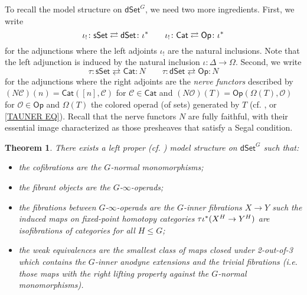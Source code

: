 \documentclass[a4paper,10pt]{article}%
\numberwithin{equation}{section}
\numberwithin{figure}{section}
\newtheorem{theorem}[equation]{Theorem}%
\theoremstyle{definition} %
\newcommand{\dSet}{\mathsf{dSet}}
\newcommand{\1}{\ensuremath{\mathbbm 1}}%
\begin{document}
To recall the model structure on $\mathsf{dSet}^G$,
we need two more ingredients.
First, we write
\begin{equation}\label{IOTASHADJ EQ}
	\iota_! \colon 
	\mathsf{sSet}
	\rightleftarrows
	\mathsf{dSet}
	\colon
	\iota^{\**}
\qquad
	\iota_! \colon 
	\mathsf{Cat}
	\rightleftarrows
	\mathsf{Op}
	\colon
	\iota^{\**}
\end{equation}
for the adjunctions
where the left adjoints $\iota_!$
are the natural inclusions.
Note that the left adjunction is induced by the natural inclusion
$\iota \colon \Delta \to \Omega$.
Second, we write
\begin{equation}\label{TAUADJ EQ}
	\tau \colon 
	\mathsf{sSet}
	\rightleftarrows
	\mathsf{Cat}
	\colon
	N
\qquad
	\tau \colon 
	\mathsf{dSet}
	\rightleftarrows
	\mathsf{Op}
	\colon
	N
\end{equation}
for the adjunctions where the right adjoints are the 
\emph{nerve functors}
described by
$(N \mathcal{C})(n) = 
\mathsf{Cat}\left([n],\mathcal{C}\right)$
for $\mathcal{C}\in \mathsf{Cat}$
and
$(N \mathcal{O})(T) = 
\mathsf{Op}\left(\Omega(T),\mathcal{O}\right)$
for $\mathcal{O}\in \mathsf{Op}$
and $\Omega(T)$ the colored operad (of sets) generated by $T$
(cf. \cite[\S 3]{MW07}, \cite[Rem. 4.4, Ex. 4.6]{Per18} or \eqref{TAUNER EQ}).
Recall \cite[Prop. 5.3 and Thm. 6.1]{MW09}
that the nerve functors $N$ are fully faithful, 
with their essential image characterized
as those presheaves 
that satisfy a Segal condition.



\begin{theorem}\label{DSETGMOD THM}
	{\cite[Thm 2.1]{Per18}}
There exists a left proper (cf. \cite[Prop. 8.8]{Per18}) model structure on $\dSet^G$ such that:
\begin{itemize}
	\item the cofibrations are the $G$-normal monomorphisms;
	\item the fibrant objects are the $G$-$\infty$-operads;
	\item the fibrations between
	$G$-$\infty$-operads 
	are the $G$-inner fibrations $X \to Y$
	such the induced maps on 
	fixed-point homotopy categories 
	$\tau \iota^{\**}(X^H \to Y^H)$ are isofibrations of categories for all $H \leq G$;
	\item the weak equivalences are the smallest class of maps closed under 2-out-of-3 which
	contains the $G$-inner anodyne extensions and the trivial fibrations
	(i.e. those maps with the right lifting property against the $G$-normal monomorphisms).
\end{itemize}
\end{theorem}
\end{document}
